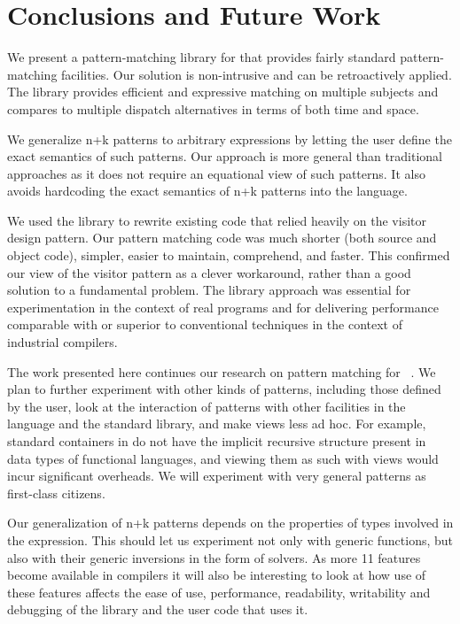 \section{Conclusions and Future Work} %
\label{sec:cc}

We present a pattern-matching library for \Cpp{} that provides fairly standard
pattern-matching facilities. Our solution is non-intrusive and can be 
retroactively applied. %
The library provides efficient and expressive matching on multiple subjects and 
compares to multiple dispatch alternatives in terms of both time and space.

We generalize n+k patterns to arbitrary expressions by letting the user define 
the exact semantics of such patterns. Our approach is more general than traditional approaches 
as it does not require an
equational view of such patterns. It also avoids hardcoding the 
exact semantics of n+k patterns into the language. 

We used the library to rewrite existing code that relied heavily on the 
visitor design pattern.
Our pattern matching code was much shorter (both source and object code), 
simpler, easier to maintain, comprehend, and faster. 
This confirmed our view of the visitor pattern as a clever workaround,
rather than a good solution to a fundamental problem.
The library approach was essential 
for experimentation in the context of real programs and for delivering 
performance comparable with or superior to conventional techniques in the 
context of industrial compilers.

The work presented here continues our research on pattern matching for 
\Cpp{}~\cite{TS12}. We plan to further experiment with other kinds of patterns, 
including those defined by the user, look at the interaction of patterns with 
other facilities in the language and the standard library, and make views less 
ad hoc. For example, standard containers in \Cpp{} do not have the implicit 
recursive structure present in data types of functional languages, and viewing 
them as such with views would incur significant overheads. We will experiment 
with very general patterns as first-class citizens.

Our generalization of n+k patterns depends on the properties of types involved 
in the expression. This should let us experiment not only with generic 
functions, but also with their generic inversions in the form of solvers. As 
more \Cpp{}11 features become available in compilers it will also be interesting to 
look at how use of these features affects the ease of use, performance, 
readability, writability and debugging of the library and the user code that 
uses it.

